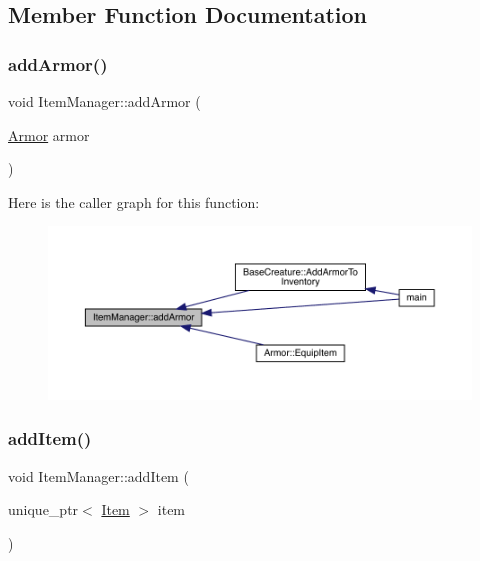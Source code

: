 \subsection{Member Function Documentation}
\mbox{\label{class_item_manager_af16502a871d116ebd2241cd8d2d745f5}} 
\subsubsection{\texorpdfstring{add\+Armor()}{addArmor()}}
{\footnotesize\ttfamily void Item\+Manager\+::add\+Armor (\begin{DoxyParamCaption}\item[{\mbox{\hyperlink{class_armor}{Armor}}}]{armor }\end{DoxyParamCaption})}

Here is the caller graph for this function\+:
\nopagebreak
\begin{figure}[H]
\begin{center}
\leavevmode
\includegraphics[width=350pt]{dc/de1/class_item_manager_af16502a871d116ebd2241cd8d2d745f5_icgraph}
\end{center}
\end{figure}
\mbox{\label{class_item_manager_af86e2b751da18d6d142c29f8c4860323}} 
\subsubsection{\texorpdfstring{add\+Item()}{addItem()}}
{\footnotesize\ttfamily void Item\+Manager\+::add\+Item (\begin{DoxyParamCaption}\item[{unique\+\_\+ptr$<$ \mbox{\hyperlink{class_item}{Item}} $>$}]{item }\end{DoxyParamCaption})}

